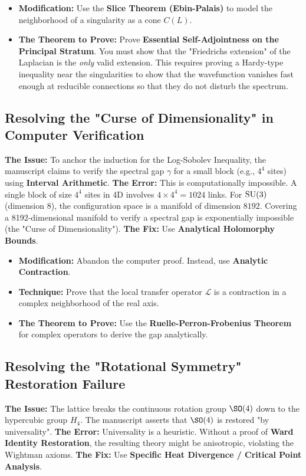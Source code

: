 \begin{itemize}
    \item \textbf{Modification:} Use the \textbf{Slice Theorem (Ebin-Palais)} to model the neighborhood of a singularity as a cone $C(L)$.
    \item \textbf{The Theorem to Prove:} Prove \textbf{Essential Self-Adjointness on the Principal Stratum}. You must show that the "Friedrichs extension" of the Laplacian is the \textit{only} valid extension. This requires proving a Hardy-type inequality near the singularities to show that the wavefunction vanishes fast enough at reducible connections so that they do not disturb the spectrum.
\end{itemize}

\subsection{Resolving the "Curse of Dimensionality" in Computer Verification}
\textbf{The Issue:} To anchor the induction for the Log-Sobolev Inequality, the manuscript claims to verify the spectral gap $\gamma$ for a small block (e.g., $4^4$ sites) using \textbf{Interval Arithmetic}.
\textbf{The Error:} This is computationally impossible. A single block of size $4^4$ sites in 4D involves $4 \times 4^4 = 1024$ links. For $\mathrm{SU}(3)$ (dimension 8), the configuration space is a manifold of dimension $8192$. Covering a 8192-dimensional manifold to verify a spectral gap is exponentially impossible (the "Curse of Dimensionality").
\textbf{The Fix:} Use \textbf{Analytical Holomorphy Bounds}.

\begin{itemize}
    \item \textbf{Modification:} Abandon the computer proof. Instead, use \textbf{Analytic Contraction}.
    \item \textbf{Technique:} Prove that the local transfer operator $\mathcal{L}$ is a contraction in a complex neighborhood of the real axis.
    \item \textbf{The Theorem to Prove:} Use the \textbf{Ruelle-Perron-Frobenius Theorem} for complex operators to derive the gap analytically.
\end{itemize}

\subsection{Resolving the "Rotational Symmetry" Restoration Failure}
\textbf{The Issue:} The lattice breaks the continuous rotation group $\SO(4)$ down to the hypercubic group $H_4$. The manuscript asserts that $\SO(4)$ is restored "by universality".
\textbf{The Error:} Universality is a heuristic. Without a proof of \textbf{Ward Identity Restoration}, the resulting theory might be anisotropic, violating the Wightman axioms.
\textbf{The Fix:} Use \textbf{Specific Heat Divergence / Critical Point Analysis}.

